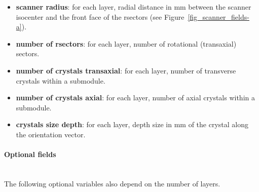 \documentclass[a4paper, 11pt]{article}
\begin{document}
\begin{itemize}
  \item \textbf{scanner radius}: for each layer, radial distance in mm between the scanner isocenter and the front face of the rsectors (see
        Figure~\ref{fig_scanner_fields-a}).
  \item \textbf{number of rsectors}: for each layer, number of rotational (transaxial) sectors.
  \item \textbf{number of crystals transaxial}: for each layer, number of transverse crystals within a submodule.
  \item \textbf{number of crystals axial}: for each layer, number of axial crystals within a submodule.
  \item \textbf{crystals size depth}: for each layer, depth size in mm of the crystal along the orientation vector.
\end{itemize}

\paragraph{Optional fields} \
\\
The following optional variables also depend on the number of layers.
\end{document}
